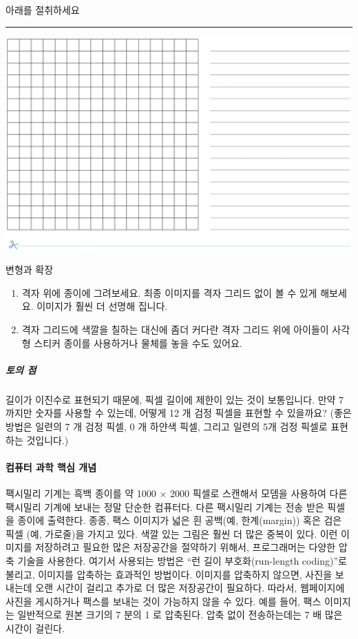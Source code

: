 \documentclass[]{article}
\begin{document}
아래를 절취하세요

\begin{center}\rule{0.5\linewidth}{\linethickness}\end{center}

\includegraphics{csunplugged/01-part/img/ch02-img/02-image-04-worksheet-01.png}

변형과 확장

\begin{enumerate}
\itemsep1pt\parskip0pt
\item
  격자 위에 종이에 그려보세요. 최종 이미지를 격자 그리드 없이 볼 수 있게
  해보세요. 이미지가 훨씬 더 선명해 집니다.
\item
  격자 그리드에 색깔을 칠하는 대신에 좀더 커다란 격자 그리드 위에
  아이들이 사각형 스티커 종이를 사용하거나 물체를 놓을 수도 있어요.
\end{enumerate}

\subparagraph{토의 점}\label{section-39}

길이가 이진수로 표현되기 때문에, 픽셀 길이에 제한이 있는 것이
보통입니다. 만약 7 까지만 숫자를 사용할 수 있는데, 어떻게 12 개 검정
픽셀을 표현할 수 있을까요? (좋은 방법은 일련의 7 개 검정 픽셀, 0 개
하얀색 픽셀, 그리고 일련의 5개 검정 픽셀로 표현하는 것입니다.)

\mbox{}\paragraph{컴퓨터 과학 핵심 개념}\label{section-40}

팩시밀리 기계는 흑백 종이를 약 1000 × 2000 픽셀로 스캔해서 모뎀을
사용하여 다른 팩시밀리 기계에 보내는 정말 단순한 컴퓨터다. 다른 팩시밀리
기계는 전송 받은 픽셀을 종이에 출력한다. 종종, 팩스 이미지가 넓은 흰
공백(예, 한계(margin)) 혹은 검은 픽셀 (예, 가로줄)을 가지고 있다. 색깔
있는 그림은 훨씬 더 많은 중복이 있다. 이런 이미지를 저장하려고 필요한
많은 저장공간을 절약하기 위해서, 프로그래머는 다양한 압축 기술을
사용한다. 여기서 사용되는 방법은 ``런 길이 부호화(run-length coding)''로
불리고, 이미지를 압축하는 효과적인 방법이다. 이미지를 압축하지 않으면,
사진을 보내는데 오랜 시간이 걸리고 추가로 더 많은 저장공간이 필요하다.
따라서, 웹페이지에 사진을 게시하거나 팩스를 보내는 것이 가능하지 않을 수
있다. 예를 들어, 팩스 이미지는 일반적으로 원본 크기의 7 분의 1 로
압축된다. 압축 없이 전송하는데는 7 배 많은 시간이 걸린다.
\end{document}
